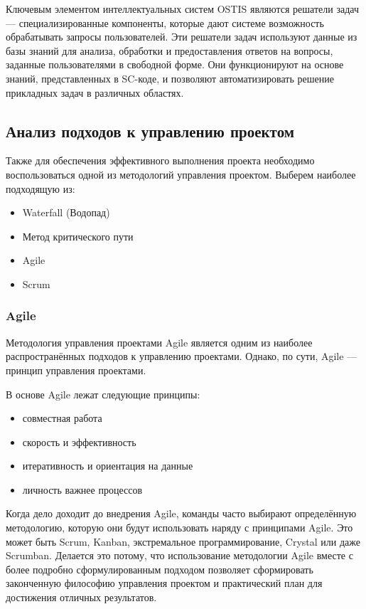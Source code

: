 Ключевым элементом интеллектуальных систем OSTIS являются решатели задач — специализированные компоненты, которые дают системе возможность обрабатывать запросы пользователей. Эти решатели задач используют данные из базы знаний для анализа, обработки и предоставления ответов на вопросы, заданные пользователями в свободной форме. Они функционируют на основе знаний, представленных в SC-коде, и позволяют автоматизировать решение прикладных задач в различных областях.


\subsection{Анализ подходов к управлению проектом}

Также для обеспечения эффективного выполнения проекта необходимо воспользоваться одной из методологий управления проектом. Выберем наиболее подходящую из:

\begin{itemize}
    \item Waterfall (Водопад)
    \item Метод критического пути
    \item Agile
    \item Scrum
\end{itemize}
\subsubsection{Agile}

 Методология управления проектами Agile является одним из наиболее распространённых подходов к управлению проектами. Однако, по сути, Agile — принцип управления проектами. 

В основе Agile лежат следующие принципы:

\begin{itemize}
    \item совместная работа
    \item скорость и эффективность
    \item итеративность и ориентация на данные
    \item личность важнее процессов
\end{itemize}

Когда дело доходит до внедрения Agile, команды часто выбирают определённую методологию, которую они будут использовать наряду с принципами Agile. Это может быть Scrum, Kanban, экстремальное программирование, Crystal или даже Scrumban. Делается это потому, что использование методологии Agile вместе с более подробно сформулированным подходом позволяет сформировать законченную философию управления проектом и практический план для достижения отличных результатов.

